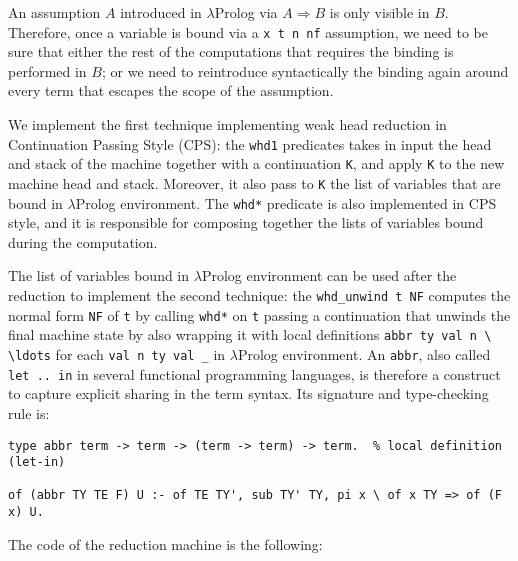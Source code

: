 An assumption $A$ introduced in $\lambda$Prolog via $A \Rightarrow B$ is only visible in $B$. Therefore, once a variable is bound via a \verb+x t n nf+ assumption, we need to be sure that either the rest of the computations that requires the binding is performed in $B$; or we need to reintroduce syntactically the binding again around every term that escapes the scope of the assumption.

We implement the first technique implementing weak head reduction in Continuation Passing Style (CPS): the \verb+whd1+ predicates takes in input the head and stack of the machine together with a continuation \verb+K+, and apply \verb+K+ to the new machine head and stack. Moreover, it also pass to \verb+K+ the list of variables that are bound in $\lambda$Prolog environment. The \verb+whd*+ predicate is also implemented in CPS style, and it is responsible for composing together the lists of variables bound during the computation.

The list of variables bound in $\lambda$Prolog environment can be used after the reduction to implement the second technique: the \verb+whd_unwind t NF+ computes the normal form \verb+NF+ of \verb+t+ by calling \verb+whd*+ on \verb+t+ passing a continuation that unwinds the final machine state by also wrapping it with local definitions \verb+abbr ty val n \ \ldots+ for each \verb+val n ty val _+ in $\lambda$Prolog environment. An \verb+abbr+, also called \verb+let .. in+ in several functional programming languages, is therefore a construct to capture explicit sharing in the term syntax. Its signature and type-checking rule is:

\begin{verbatim}
type abbr term -> term -> (term -> term) -> term.  % local definition (let-in)

of (abbr TY TE F) U :- of TE TY', sub TY' TY, pi x \ of x TY => of (F x) U.
\end{verbatim}

The code of the reduction machine is the following:

